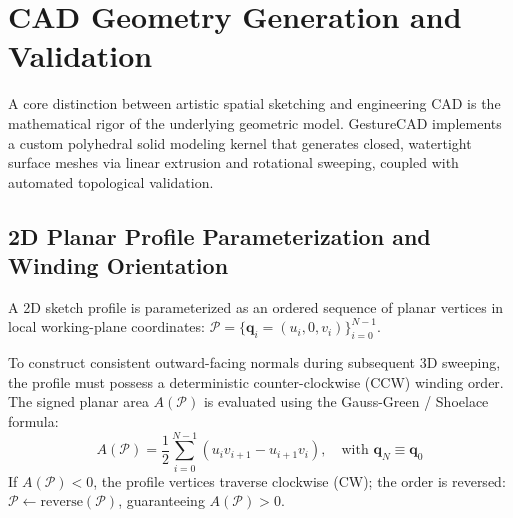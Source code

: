 \section{CAD Geometry Generation and Validation}
\label{sec:geometry}

A core distinction between artistic spatial sketching and engineering CAD is the mathematical rigor of the underlying geometric model. GestureCAD implements a custom polyhedral solid modeling kernel that generates closed, watertight surface meshes via linear extrusion and rotational sweeping, coupled with automated topological validation.

\subsection{2D Planar Profile Parameterization and Winding Orientation}
A 2D sketch profile is parameterized as an ordered sequence of planar vertices in local working-plane coordinates: $\mathcal{P} = \{\mathbf{q}_i = (u_i, 0, v_i)\}_{i=0}^{N-1}$. 

To construct consistent outward-facing normals during subsequent 3D sweeping, the profile must possess a deterministic counter-clockwise (CCW) winding order. The signed planar area $A(\mathcal{P})$ is evaluated using the Gauss-Green / Shoelace formula:
\begin{equation}
A(\mathcal{P}) = \frac{1}{2} \sum_{i=0}^{N-1} (u_i v_{i+1} - u_{i+1} v_i), \quad \text{with } \mathbf{q}_N \equiv \mathbf{q}_0
\label{eq:shoelace}
\end{equation}
If $A(\mathcal{P}) < 0$, the profile vertices traverse clockwise (CW); the order is reversed: $\mathcal{P} \leftarrow \text{reverse}(\mathcal{P})$, guaranteeing $A(\mathcal{P}) > 0$.

